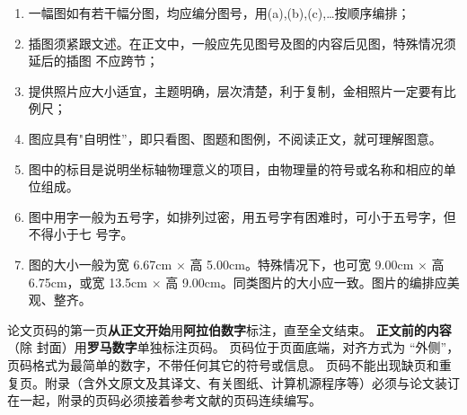 
\begin{enumerate}[wide, label=\arabic*),  labelindent=21pt]
    \item 一幅图如有若干幅分图，均应编分图号，用(a),(b),(c),…按顺序编排；
    \item 插图须紧跟文述。在正文中，一般应先见图号及图的内容后见图，特殊情况须延后的插图
不应跨节； 
    \item 提供照片应大小适宜，主题明确，层次清楚，利于复制，金相照片一定要有比例尺；
    \item 图应具有"自明性”，即只看图、图题和图例，不阅读正文，就可理解图意。
    \item 图中的标目是说明坐标轴物理意义的项目，由物理量的符号或名称和相应的单位组成。
    \item 图中用字一般为五号字，如排列过密，用五号字有困难时，可小于五号字，但不得小于七
号字。 
    \item 图的大小一般为宽 6.67cm $\times$ 高 5.00cm。特殊情况下，也可宽 9.00cm $\times$ 高 6.75cm，或宽 13.5cm
$\times$ 高 9.00cm。同类图片的大小应一致。图片的编排应美观、整齐。
\end{enumerate}




论文页码的第一页\textbf{从正文开始}用\textbf{阿拉伯数字}标注，直至全文结束。
\textbf{正文前的内容}（除 封面）用\textbf{罗马数字}单独标注页码。
页码位于页面底端，对齐方式为 “外侧”，页码格式为最简单的数字，不带任何其它的符号或信息。
页码不能出现缺页和重复页。附录（含外文原文及其译文、有关图纸、计算机源程序等）必须与论文装订在一起，附录的页码必须接着参考文献的页码连续编写。
